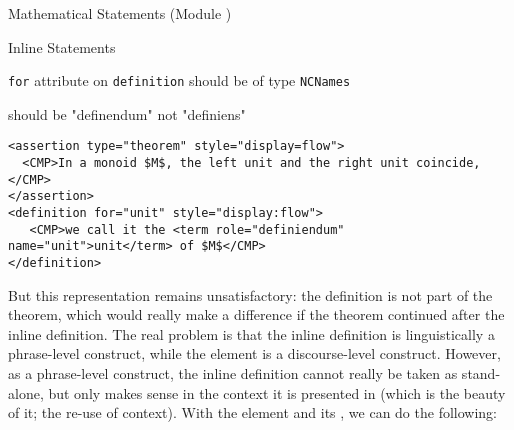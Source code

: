 \begin{tchapter}[id=statements,short=Mathematical Statements]{Mathematical Statements (Module {})}
\begin{tsection}[id=inline-statements]{Inline Statements}
\begin{erratum}[reported-by=Michael Kohlhase,date=2009-08-11]{{\texttt{for}} attribute on
    {\texttt{definition}} should be of type {\texttt{NCNames}}}
\begin{erratum}[reported-by=Krzysztof Retel,date=2006-09-14]{should be "definendum" not "definiens"}
\begin{lstlisting}[mathescape,caption=A Simple-Minded Representation of {\bf{Theorem 3.12}}]
<assertion type="theorem" style="display=flow">
  <CMP>In a monoid $M$, the left unit and the right unit coincide,</CMP>
</assertion>
<definition for="unit" style="display:flow">
   <CMP>we call it the <term role="definiendum" name="unit">unit</term> of $M$</CMP>
</definition>
\end{lstlisting}
\end{erratum}
\end{erratum}

But this representation remains unsatisfactory: the definition is not part of the theorem,
which would really make a difference if the theorem continued after the inline
definition. The real problem is that the inline definition is linguistically a
phrase-level construct, while the {} element is a discourse-level
construct. However, as a phrase-level construct, the inline definition cannot really be
taken as stand-alone, but only makes sense in the context it is presented in (which is the
beauty of it; the re-use of context). With the {} element and its
{}, we can do the following:


\end{tsection}
\end{tchapter}
